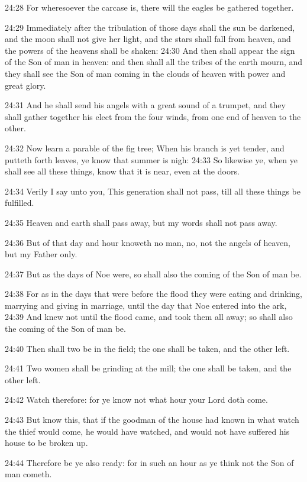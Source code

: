 24:28 For wheresoever the carcase is, there will the eagles be gathered together.

24:29 Immediately after the tribulation of those days shall the sun be darkened, and the moon shall not give her light, and the stars shall fall from heaven, and the powers of the heavens shall be shaken: 24:30 And then shall appear the sign of the Son of man in heaven: and then shall all the tribes of the earth mourn, and they shall see the Son of man coming in the clouds of heaven with power and great glory.

24:31 And he shall send his angels with a great sound of a trumpet, and they shall gather together his elect from the four winds, from one end of heaven to the other.

24:32 Now learn a parable of the fig tree; When his branch is yet tender, and putteth forth leaves, ye know that summer is nigh: 24:33 So likewise ye, when ye shall see all these things, know that it is near, even at the doors.

24:34 Verily I say unto you, This generation shall not pass, till all these things be fulfilled.

24:35 Heaven and earth shall pass away, but my words shall not pass away.

24:36 But of that day and hour knoweth no man, no, not the angels of heaven, but my Father only.

24:37 But as the days of Noe were, so shall also the coming of the Son of man be.

24:38 For as in the days that were before the flood they were eating and drinking, marrying and giving in marriage, until the day that Noe entered into the ark, 24:39 And knew not until the flood came, and took them all away; so shall also the coming of the Son of man be.

24:40 Then shall two be in the field; the one shall be taken, and the other left.

24:41 Two women shall be grinding at the mill; the one shall be taken, and the other left.

24:42 Watch therefore: for ye know not what hour your Lord doth come.

24:43 But know this, that if the goodman of the house had known in what watch the thief would come, he would have watched, and would not have suffered his house to be broken up.

24:44 Therefore be ye also ready: for in such an hour as ye think not the Son of man cometh.

